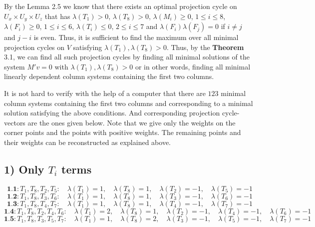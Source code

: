 \documentclass[12p]{article}
\numberwithin{equation}{section}
\begin{document}
By the Lemma 2.5 we know that there exists an optimal projection cycle on \(U_x \times U_y \times U_z\) that has $\lambda(T_1)>0$, $\lambda(T_8)>0$, $\lambda(M_i) \ge 0$, $1 \le i \le 8$, $\lambda(F_i) \ge 0$, $1 \le i \le 6$, $\lambda(T_i) \le 0$, $2 \le i \le 7$ and $\lambda(F_i)\lambda(F_j)=0$ if $i \neq j$ and $j-i$ is even. Thus, it is sufficient to find the maximum over all minimal projection cycles on \(V\) satisfying  \(\lambda(T_1),\lambda(T_8)>0.\) Thus, by the \textbf{Theorem} 3.1, we can find all such projection cycles by finding all minimal solutions of the system \(M'v=0\) with \(\lambda(T_1),\lambda(T_8)>0\) or in other words, finding all minimal linearly dependent column systems containing the first two columns.

It is not hard to verify with the help of a computer that there are \(123\) minimal column systems containing the first two columns and corresponding to a minimal solution satisfying the above conditions. And corresponding projection cycle-vectors are the ones given below. Note that we give only the weights on the corner points and the points with positive weights. The remaining points and their weights can be reconstructed as explained above.

\subsection*{1) Only $T_i$ terms}
\[
\textbf{1.1}: T_1, T_8, T_2, T_5:\quad \lambda(T_1) = 1,\quad \lambda(T_8) = 1,\quad \lambda(T_2) = -1,\quad \lambda(T_5) = -1
\]
\[
\textbf{1.2}: T_1, T_8, T_3, T_6:\quad \lambda(T_1) = 1,\quad \lambda(T_8) = 1,\quad \lambda(T_3) = -1,\quad \lambda(T_6) = -1
\]
\[
\textbf{1.3}: T_1, T_8, T_4, T_7:\quad \lambda(T_1) = 1,\quad \lambda(T_8) = 1,\quad \lambda(T_4) = -1,\quad \lambda(T_7) = -1
\]
\[
\textbf{1.4}: T_1, T_8, T_2, T_4, T_6:\quad \lambda(T_1) = 2,\quad \lambda(T_8) = 1,\quad \lambda(T_2) = -1,\quad \lambda(T_4) = -1,\quad \lambda(T_6) = -1
\]
\[
\textbf{1.5}: T_1, T_8, T_3, T_5, T_7:\quad \lambda(T_1) = 1,\quad \lambda(T_8) = 2,\quad \lambda(T_3) = -1,\quad \lambda(T_5) = -1,\quad \lambda(T_7) = -1
\]
\end{document}
